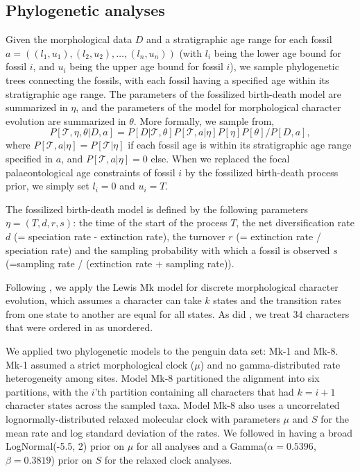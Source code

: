 \documentclass[11pt]{article}
\newcommand{\Mstrict}{{Mk-1}}
\newcommand{\Mrelaxed}{{Mk-8}}
\begin{document}
\subsection*{Phylogenetic analyses}

Given the morphological data $D$ and a stratigraphic age range for each fossil $a = ((l_1,u_1),(l_2, u_2),\ldots,(l_n,u_n))$ (with $l_i$ being the lower age bound for fossil $i$, and $u_i$ being the upper age bound for fossil $i$), we sample phylogenetic trees connecting the fossils, with each fossil having a specified age within its stratigraphic age range. The parameters of the fossilized birth-death model are summarized in $\eta$, and the parameters  of the model for morphological character evolution are summarized in $\theta$. More formally, we sample from,
$$P[\mathcal{T},\eta, \theta | D, a] = P[D|\mathcal{T},\theta] P[\mathcal{T},a|\eta] P[\eta] P[\theta]/P[D,a],$$
where $ P[\mathcal{T},a|\eta] =  P[\mathcal{T}|\eta] $ if each fossil age is within its stratigraphic age range specified in $a$, and $ P[\mathcal{T},a|\eta] =0$ else.
When we replaced the focal  palaeontological age constraints of fossil $i$  by 
the fossilized birth-death process prior, we simply set $l_i=0$ and $u_i=T$.

The fossilized birth-death model is defined by the following parameters $\eta=(T,d,r,s)$:  the time of the start of the process $T$, the net diversification rate $d$ (= speciation rate - extinction rate), the turnover $r$ (= extinction rate / speciation rate) and the sampling probability with which a fossil is observed $s$ (=sampling rate / (extinction rate + sampling rate)).
  
Following \cite{gavryushkina2015bayesian}, we apply the Lewis Mk model 
\cite{Lewis2001} for discrete morphological character evolution, which assumes a character can take $k$ states and the transition rates from one state to another are equal for all states. As did \cite{gavryushkina2015bayesian}, we treat 34 characters that were ordered in \cite{ksepka2012} as unordered. 

We applied two phylogenetic models to the penguin data set: \Mstrict{} and \Mrelaxed{}. \Mstrict{} assumed a strict morphological clock ($\mu$) and no gamma-distributed rate heterogeneity among sites. Model \Mrelaxed{} partitioned the alignment into six partitions, with the $i$'th partition containing all characters that had $k=i+1$ character states across the sampled taxa. Model \Mrelaxed{} also uses a uncorrelated lognormally-distributed relaxed molecular clock \cite{Drummond2006} with parameters $\mu$ and $S$ for the mean rate and log standard deviation of the rates. We followed \cite{gavryushkina2015bayesian} in having a broad LogNormal(-5.5, 2) prior on $\mu$ for all analyses and a Gamma($\alpha=0.5396$, $\beta=0.3819$) prior on $S$ for the relaxed clock analyses.
\end{document}
